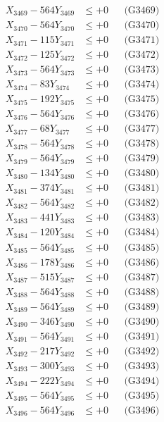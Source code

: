 \documentclass[a4paper,10pt]{article}
\begin{document}
{\begin{align}
X_{3469} - 564Y_{3469} &\leq +0 && \text{(G3469)} \\
X_{3470} - 564Y_{3470} &\leq +0 && \text{(G3470)} \\
\allowbreak
X_{3471} - 115Y_{3471} &\leq +0 && \text{(G3471)} \\
X_{3472} - 125Y_{3472} &\leq +0 && \text{(G3472)} \\
X_{3473} - 564Y_{3473} &\leq +0 && \text{(G3473)} \\
X_{3474} - 83Y_{3474} &\leq +0 && \text{(G3474)} \\
X_{3475} - 192Y_{3475} &\leq +0 && \text{(G3475)} \\
X_{3476} - 564Y_{3476} &\leq +0 && \text{(G3476)} \\
X_{3477} - 68Y_{3477} &\leq +0 && \text{(G3477)} \\
X_{3478} - 564Y_{3478} &\leq +0 && \text{(G3478)} \\
X_{3479} - 564Y_{3479} &\leq +0 && \text{(G3479)} \\
X_{3480} - 134Y_{3480} &\leq +0 && \text{(G3480)} \\
\allowbreak
X_{3481} - 374Y_{3481} &\leq +0 && \text{(G3481)} \\
X_{3482} - 564Y_{3482} &\leq +0 && \text{(G3482)} \\
X_{3483} - 441Y_{3483} &\leq +0 && \text{(G3483)} \\
X_{3484} - 120Y_{3484} &\leq +0 && \text{(G3484)} \\
X_{3485} - 564Y_{3485} &\leq +0 && \text{(G3485)} \\
X_{3486} - 178Y_{3486} &\leq +0 && \text{(G3486)} \\
X_{3487} - 515Y_{3487} &\leq +0 && \text{(G3487)} \\
X_{3488} - 564Y_{3488} &\leq +0 && \text{(G3488)} \\
X_{3489} - 564Y_{3489} &\leq +0 && \text{(G3489)} \\
X_{3490} - 346Y_{3490} &\leq +0 && \text{(G3490)} \\
\allowbreak
X_{3491} - 564Y_{3491} &\leq +0 && \text{(G3491)} \\
X_{3492} - 217Y_{3492} &\leq +0 && \text{(G3492)} \\
X_{3493} - 300Y_{3493} &\leq +0 && \text{(G3493)} \\
X_{3494} - 222Y_{3494} &\leq +0 && \text{(G3494)} \\
X_{3495} - 564Y_{3495} &\leq +0 && \text{(G3495)} \\
X_{3496} - 564Y_{3496} &\leq +0 && \text{(G3496)} \\

\end{align}}
\end{document}
